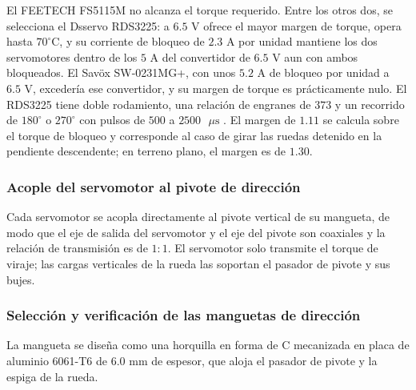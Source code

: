 \documentclass[../../General.tex]{subfiles}
\begin{document}
El FEETECH FS5115M no alcanza el torque requerido. Entre los otros dos, se selecciona el Dsservo RDS3225: a $6.5\text{ V}$ ofrece el mayor margen de torque, opera hasta $70^\circ\text{C}$, y su corriente de bloqueo de $2.3\text{ A}$ por unidad mantiene los dos servomotores dentro de los $5\text{ A}$ del convertidor de $6.5\text{ V}$ aun con ambos bloqueados. El Savöx SW-0231MG+, con unos $5.2\text{ A}$ de bloqueo por unidad a $6.5\text{ V}$, excedería ese convertidor, y su margen de torque es prácticamente nulo. El RDS3225 tiene doble rodamiento, una relación de engranes de $373$ y un recorrido de $180^\circ$ o $270^\circ$ con pulsos de $500$ a $2500\text{ }\mu\text{s}$ \citep{dsservo_rds3225}. El margen de $1.11$ se calcula sobre el torque de bloqueo y corresponde al caso de girar las ruedas detenido en la pendiente descendente; en terreno plano, el margen es de $1.30$.

\subsubsection{Acople del servomotor al pivote de dirección}
Cada servomotor se acopla directamente al pivote vertical de su mangueta, de modo que el eje de salida del servomotor y el eje del pivote son coaxiales y la relación de transmisión es de $1:1$. El servomotor solo transmite el torque de viraje; las cargas verticales de la rueda las soportan el pasador de pivote y sus bujes.

\subsubsection{Selección y verificación de las manguetas de dirección}
La mangueta se diseña como una horquilla en forma de C mecanizada en placa de aluminio 6061-T6 de $6.0\text{ mm}$ de espesor, que aloja el pasador de pivote y la espiga de la rueda.
\end{document}
